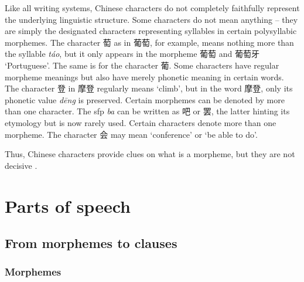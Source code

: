 \documentclass[UTF8, a4paper, oneside, scheme=plain, 12pt]{ctexrep}
\newcommand{\form}[1]{\emph{#1}}
\newcommand{\translate}[1]{`#1'}
\begin{document}
Like all writing systems, 
Chinese characters do not completely faithfully represent 
the underlying linguistic structure.
Some characters do not mean anything -- 
they are simply the designated characters representing syllables 
in certain polysyllabic morphemes.
The character 萄 as in 葡萄, for example, 
means nothing more than the syllable \form{t\'{a}o},
but it only appears in the morpheme 葡萄 and 葡萄牙 \translate{Portuguese}.
The same is for the character 葡.
Some characters have regular morpheme meanings
but also have merely phonetic meaning in certain words.
The character 登 in 摩登 regularly means \translate{climb},
but in the word 摩登, only its phonetic value \form{d\={e}ng} is preserved.
Certain morphemes can be denoted by more than one character.
The \ac{sfp} \form{ba} can be written as 吧 or 罢,
the latter hinting its etymology but is now rarely used.
Certain characters denote more than one morpheme.
The character 会 may mean \translate{conference} or \translate{be able to do}. 

Thus, Chinese characters provide clues on what is a morpheme,
but they are not decisive \citep[1.1.4]{zhudexigrammar}.

\chapter{Parts of speech}

\section{From morphemes to clauses}

\subsection{Morphemes}\label{sec:pos.morpheme}
\end{document}

